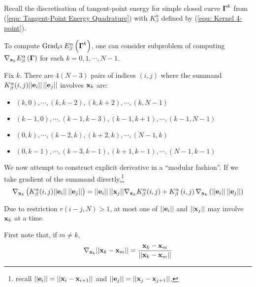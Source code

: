 \documentclass[../dissertation.tex]{subfiles}
\begin{document}
Recall the discretisation of tangent-point energy for simple closed curve $\boldsymbol{\Gamma}^k$ from (\ref{equ: Tangent-Point Energy Quadrature})
with $K_{\beta}^{\alpha}$ defined by (\ref{equ: Kernel 4-point}).

To compute $\operatorname{Grad}_{\ell^2} E_{\beta}^{\alpha} \left( \boldsymbol{\Gamma}^k \right)$,
one can consider subproblem of computing $\nabla_{\mathbf{x}_k} E_{\beta}^{\alpha} \left( \boldsymbol{\Gamma} \right)$
for each $k=0, 1, \cdots, N-1$.

Fix $k$.
There are $4\left( N-3 \right)$ pairs of indices $(i,j)$ where the summand $K_{\beta}^{\alpha} (i,j) \lvert \lvert \mathbf{e}_i \rvert \rvert\,\lvert \lvert \mathbf{e}_j \rvert \rvert$ involves $\mathbf{x}_k$ are:
\begin{itemize}
    \item $(k,0), \cdots, (k,k-2), (k,k+2), \cdots, (k,N-1)$
    \item $(k-1,0), \cdots, (k-1,k-3), (k-1,k+1), \cdots, (k-1,N-1)$
    \item $(0, k), \cdots, (k-2,k), (k+2,k), \cdots, (N-1,k)$
    \item $(0,k-1), \cdots, (k-3,k-1), (k+1,k-1), \cdots, (N-1, k-1)$
\end{itemize}

We now attempt to construct explicit derivative in a ``modular fashion''.
If we take gradient of the summand directly,\footnote{recall $\lvert \lvert \mathbf{e}_i \rvert \rvert = \lvert \lvert \mathbf{x}_i - \mathbf{x}_{i+1} \rvert \rvert$ and $\lvert \lvert \mathbf{e}_j \rvert \rvert = \lvert \lvert \mathbf{x}_j - \mathbf{x}_{j+1} \rvert \rvert$.}
\begin{equation}
    \nabla_{\mathbf{x}_k} \left( K_{\beta}^{\alpha} (i,j) \lvert \lvert \mathbf{e}_i \rvert \rvert\,\lvert \lvert \mathbf{e}_j \rvert \rvert \right) = \lvert \lvert \mathbf{e}_i \rvert \rvert\,\lvert \lvert \mathbf{x}_j \rvert \rvert \nabla_{\mathbf{x}_k} K_{\beta}^{\alpha} (i,j) + K_{\beta}^{\alpha} \left( i,j \right) \nabla_{\mathbf{x}_k} \left( \lvert \lvert \mathbf{e}_i \rvert \rvert \, \lvert \lvert \mathbf{e}_j \rvert \rvert \right)
    \label{equ: Exact Gradient 1}
\end{equation}

Due to restriction $r\left( i-j,N \right) > 1$, at most one of $\lvert \lvert \mathbf{e}_i \rvert \rvert$ and $\lvert \lvert \mathbf{x}_j \rvert \rvert$ may involve $\mathbf{x}_k$ at a time.

First note that, if $m \neq k$,
\begin{equation}
    \nabla_{\mathbf{x}_k} \lvert \lvert \mathbf{x}_k - \mathbf{x}_m \rvert \rvert = \frac{\mathbf{x}_k - \mathbf{x}_m}{\lvert \lvert \mathbf{x}_k - \mathbf{x}_m \rvert \rvert}
    \label{equ: Exact Gradient 2}
\end{equation}
\end{document}

